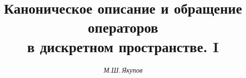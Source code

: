

 




 


\newcommand{\scd}{{}_{\textstyle\cdot}} 


\newcommand{\sscd}{{}^{\textstyle\cdot}} 


\newcommand{\col}{\operatorname{col}} 


\newcommand{\rang}{\operatorname{rang}} 


\newcommand{\tr}{\operatorname{tr}} 


\renewcommand{\Im}{\operatorname{Im}} 


\renewcommand{\ker}{\operatorname{Ker}} 


\newcommand{\up}[2]{\overset{#1}{#2}{}} 


\newcommand{\down}[2]{\underset{#1}{#2}{}} 


\newcommand{\updown}[3]{ \overset{#1}{\underset{#2}{#3}{}}{}} 




 




 


\setcounter{page}{59} 












\author{\it М.Ш.\,Якупов} 


\title{Каноническое описание и обращение операторов \\


в дискретном пространстве. I} 



